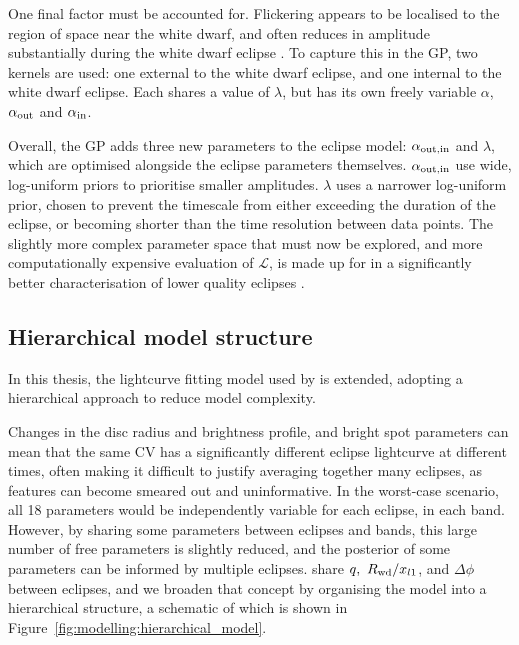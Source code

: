 One final factor must be accounted for. Flickering appears to be localised to the region of space near the white dwarf, and often reduces in amplitude substantially during the white dwarf eclipse \citep{mcallister2017}.
To capture this in the GP, two kernels are used: one external to the white dwarf eclipse, and one internal to the white dwarf eclipse. Each shares a value of $\lambda$, but has its own freely variable $\alpha$, $\alpha_{\rm out}$ and $\alpha_{\rm in}$.

Overall, the GP adds three new parameters to the eclipse model: $\alpha_{\rm out, in}$ and $\lambda$, which are optimised alongside the eclipse parameters themselves. $\alpha_{\rm out, in}$ use wide, log-uniform priors to prioritise smaller amplitudes. $\lambda$ uses a narrower log-uniform prior, chosen to prevent the timescale from either exceeding the duration of the eclipse, or becoming shorter than the time resolution between data points.
The slightly more complex parameter space that must now be explored, and more computationally expensive evaluation of $\mathcal{L}$, is made up for in a significantly better characterisation of lower quality eclipses \citep{mcallister2017}.



\subsection{Hierarchical model structure}
\label{sect:modelling:optimising eclipse model parameters}

In this thesis, the lightcurve fitting model used by \citet{McAllister2019} is extended, adopting a hierarchical approach to reduce model complexity.

Changes in the disc radius and brightness profile, and bright spot parameters can mean that the same CV has a significantly different eclipse lightcurve at different times, often making it difficult to justify averaging together many eclipses, as features can become smeared out and uninformative. In the worst-case scenario, all 18 parameters would be independently variable for each eclipse, in each band. However, by sharing some parameters between eclipses and bands, this large number of free parameters is slightly reduced, and the posterior of some parameters can be informed by multiple eclipses. \citet{mcallister2017} share $q,\ R_{\rm wd} / x_{l1}$, and $\Delta\phi$ between eclipses, and we broaden that concept by organising the model into a hierarchical structure, a schematic of which is shown in Figure~\ref{fig:modelling:hierarchical_model}.

